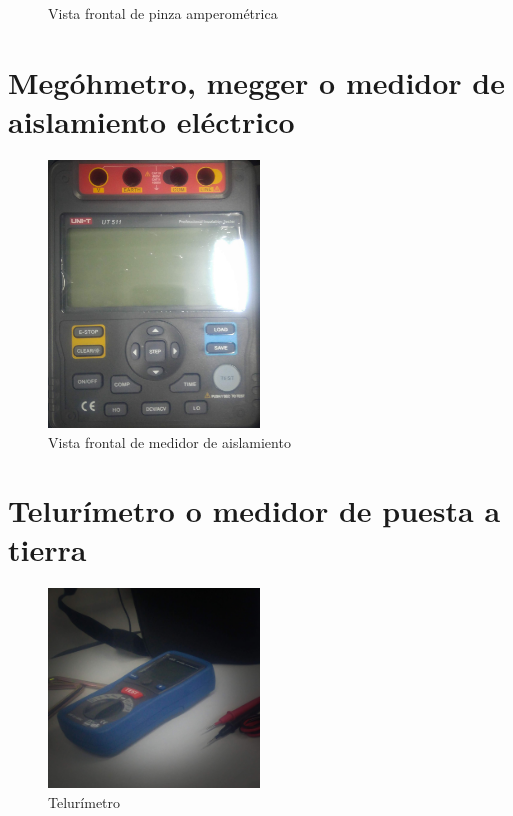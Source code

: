 \begin{figure}[htbp]
  \caption{Vista frontal de pinza amperométrica}
  \label{fig:pinza_amperometrica}
\end{figure}

\section{Megóhmetro, megger o medidor de aislamiento eléctrico}

\begin{figure}[htbp]
  \centering
  \includegraphics[width=0.5\textwidth,height=\textheight,keepaspectratio]{images/fotos/megger.jpg}
  \caption{Vista frontal de medidor de aislamiento}
  \label{fig:medidor_aislamiento}
\end{figure}

\section{Telurímetro o medidor de puesta a tierra}

\begin{figure}[htbp]
  \centering
  \includegraphics[width=0.5\textwidth,height=\textheight,keepaspectratio]{images/fotos/telurimetro1.jpg}
  \caption{Telurímetro}
  \label{fig:telurimetro}
\end{figure}

